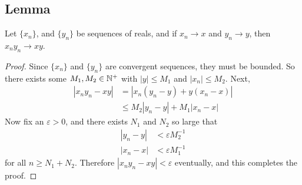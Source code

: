 \documentclass[../../main.tex]{subfiles}
\begin{document}
\providecommand{\xn}{\{x_n\}}
\providecommand{\yn}{\{y_n\}}
\subsection{Lemma}
\begin{lemma}\label{lemma:sequence converges to product}
    Let $\xn$, and $\yn$ be sequences of reals, and if $x_n\to x$ and $y_n\to y$, then $x_ny_n\to xy$.
\end{lemma}
\begin{proof}
    Since $\xn$ and $\yn$ are convergent sequences, they must be bounded. So there exists some $M_1,M_2\in\mathbb{N}^+$ with $|y|\leq M_1$ and $|x_n|\leq M_2$. Next,
    \begin{align*}
        |x_ny_n-xy|&=|x_n(y_n-y)+y(x_n-x)|\\
        &\leq M_2|y_n-y| + M_1|x_n-x|
    \end{align*}
    Now fix an $\varepsilon>0$, and there exists $N_1$ and $N_2$ so large that 
    \begin{align*}
        |y_n-y|&<\varepsilon M_2^{-1}\\
        |x_n-x|&<\varepsilon M_1^{-1}
    \end{align*}
    for all $n\geq N_1+N_2$. Therefore $|x_ny_n-xy|<\varepsilon$ eventually, and this completes the proof.
\end{proof}
\end{document}
